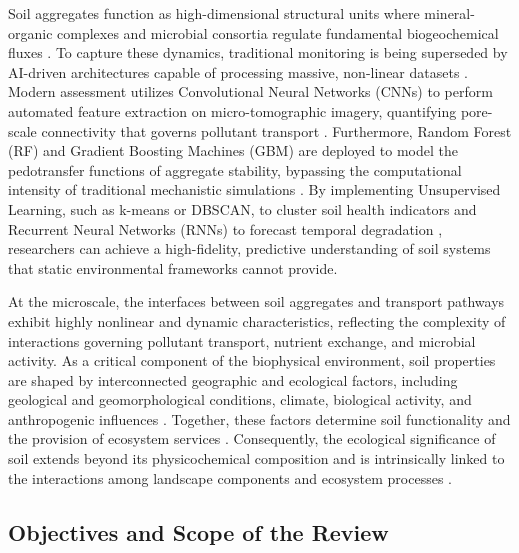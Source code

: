\documentclass[sn-mathphys-num]{sn-jnl}
\begin{document}
Soil aggregates function as high-dimensional structural units where
mineral-organic complexes and microbial consortia regulate fundamental
biogeochemical fluxes \cite{Six2004}. To capture these dynamics, traditional
monitoring is being superseded by AI-driven architectures capable of
processing massive, non-linear datasets
\cite{Lal2015,Baveye2016,Lehmann2020}. Modern assessment utilizes
Convolutional Neural Networks (CNNs) to perform automated feature extraction
on micro-tomographic imagery, quantifying pore-scale connectivity that governs
pollutant transport \cite{Demiral2026,Chen2025}. Furthermore, Random Forest
(RF) and Gradient Boosting Machines (GBM) are deployed to model the
pedotransfer functions of aggregate stability, bypassing the computational
intensity of traditional mechanistic simulations
\cite{DemissieNaveda2026,Guo2026}. By implementing Unsupervised Learning, such
as k-means or DBSCAN, to cluster soil health indicators
\cite{deOliveiraetal2022,Haller2023} and Recurrent Neural Networks (RNNs) to
forecast temporal degradation \cite{Mishra2025,Nunes2025}, researchers can
achieve a high-fidelity, predictive understanding of soil systems that static
environmental frameworks cannot provide.

At the microscale, the interfaces between soil aggregates and transport
pathways exhibit highly nonlinear and dynamic characteristics, reflecting the
complexity of interactions governing pollutant transport, nutrient exchange,
and microbial activity. As a critical component of the biophysical
environment, soil properties are shaped by interconnected geographic and
ecological factors, including geological and geomorphological conditions,
climate, biological activity, and anthropogenic influences
\cite{Brevik2015,Amundson2019}. Together, these factors determine soil
functionality and the provision of ecosystem services
\cite{Baveye2016,Klaucol2013,Klaucol2017,Lemenkova2023}. Consequently, the
ecological significance of soil extends beyond its physicochemical composition
and is intrinsically linked to the interactions among landscape components
and ecosystem processes \cite{Lemenkova2025a}.

\subsection{Objectives and Scope of the Review}\label{sec1.3}
\end{document}
